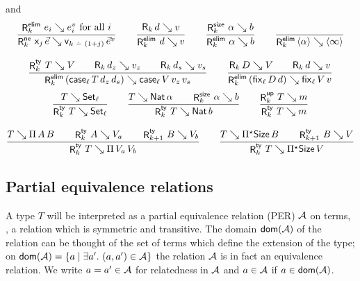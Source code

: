 \documentclass[acmlarge,review,anonymous]{acmart}\settopmatter{printfolios=true}
\begin{document}
 and 
\begin{gather*}
  \ru{%
      \RElim k {e_i} {e^v_i} \mforall i
    }{\RNe k {\lev j\,\vec e} {\ind{k \monus (1+j)}\,\vec e^v}}
\qquad
  \ru{\R k d v
    }{\RElim k d v}
\qquad
  \ru{\RSize k \alpha b
    }{\RElim k \alpha b}
\qquad
  \ru{
    }{\RElim k {\ann \alpha} {\ann \infty}}
\\[2ex]
  \ru{\RTy k T V \qquad
      \R k {d_z} {v_z} \qquad
      \R k {d_s} {v_s}
    }{\RElim k {(\case[\ell] T {d_z} {d_s})} {\case[\ell] V {v_z} {v_s}}}
\qquad
  \ru{\R k D V \qquad
      \R k d v
    }{\RElim k {(\fix[\ell] D d)} {\fix[\ell] V v}}
\end{gather*}
\begin{gather*}
  \ru{T \evalsto \Set[\ell]
    }{\RTy k T {\Set[\ell]}}
\qquad
  \ru{T \evalsto \Nat \alpha \qquad
      \RSize k \alpha b
    }{\RTy k T {\Nat b}}
\qquad
  \ru{%
      \RUp k T m
    }{\RTy k T m}
\\[2ex]
  \ru{T \evalsto \piT A B \qquad
      \RTy k A {V_a} \qquad
      \RTy {k+1} B {V_b}
    }{\RTy k T {\piT {V_a} V_b}}
\qquad
  \ru{T \evalsto \epiT \Size B \qquad
      \RTy {k+1} B {V}
    }{\RTy k T {\epiT \Size V}}
\end{gather*}




\subsection{Partial equivalence relations}
\label{sec:per}

A type $T$ will be interpreted as a partial equivalence relation (PER) $\mathcal{A}$ on terms, \ie, a relation which is symmetric and transitive. The domain $\mathop{\mathsf{dom}}\nolimits(\mathcal{A})$ of the relation can be thought of the set of terms which define the extension of the type; on $\mathop{\mathsf{dom}}\nolimits(\mathcal{A}) = \{a \mid \exists a'.\ (a,a') \in \mathcal{A} \}$ the relation $\mathcal{A}$ is in fact an equivalence relation.  We write $a = a' \in \mathcal{A}$ for relatedness in $\mathcal{A}$ and $a \in \mathcal{A}$ if $a \in \mathop{\mathsf{dom}}\nolimits(\mathcal{A})$.
\end{document}
